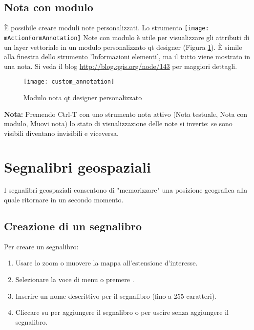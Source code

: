 \subsection{Nota con modulo}

È possibile creare moduli note personalizzati. Lo strumento \texttt{[image: mActionFormAnnotation]} Note con modulo è utile per visualizzare gli attributi di un layer vettoriale in un modulo personalizzato qt designer (Figura \ref{fig:custom-annotations}). 
È simile alla finestra dello strumento 'Informazioni elementi', ma il tutto viene mostrato in una nota. Si veda il blog \url{http://blog.qgis.org/node/143} per maggiori dettagli.

\begin{figure}[ht]
   \centering
   \texttt{[image: custom\_annotation]}
   \caption{Modulo nota qt designer personalizzato \nixcaption}
   \label{fig:custom-annotations}
\end{figure}

\textbf{Nota:} Premendo Ctrl-T con uno strumento nota attivo (Nota testuale, Nota con modulo, Muovi nota) lo stato di visualizzazione delle note si inverte: se sono visibili diventano invisibili e viceversa.

\newpage

\section{Segnalibri geospaziali}\label{sec:bookmarks}

I segnalibri geospaziali consentono di "memorizzare" una posizione geografica alla quale ritornare in un secondo momento.

\subsection{Creazione di un segnalibro}
Per creare un segnalibro:
\begin{enumerate}
\item Usare lo zoom o muovere la mappa all'estensione d'interesse.
\item Selezionare la voce di menu  \arrow
{} o premere .
\item Inserire un nome descrittivo per il segnalibro (fino a 255 caratteri).
\item Cliccare su  per aggiungere il segnalibro o 
per uscire senza aggiungere il segnalibro.
\end{enumerate}

